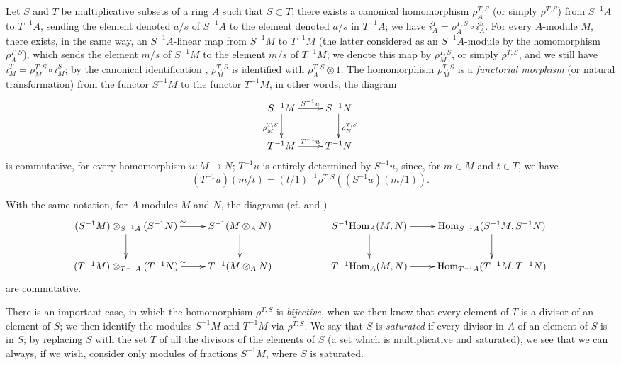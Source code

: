 \begin{env}[1.4.1]
\label{0.1.4.1}
Let $S$ and $T$ be multiplicative subsets of a ring $A$ such that $S\subset T$;
there exists a canonical homomorphism $\rho_A^{T,S}$ (or simply $\rho^{T,S}$)
from $S^{-1}A$ to $T^{-1}A$, sending the element denoted $a/s$ of $S^{-1}A$ to
the element denoted $a/s$ in $T^{-1}A$; we have $i_A^T=\rho_A^{T,S}\circ i_A^S$.
For every $A$-module $M$, there exists, in the same way, an $S^{-1}A$-linear map
from $S^{-1}M$ to $T^{-1}M$ (the latter considered as an $S^{-1}A$-module by
the homomorphism $\rho_A^{T,S}$), which sends the element $m/s$ of $S^{-1}M$
to the element $m/s$ of $T^{-1}M$; we denote this map by $\rho_M^{T,S}$, or
simply $\rho^{T,S}$, and we still have $i_M^T=\rho_M^{T,S}\circ i_M^S$; by the
canonical identification , $\rho_M^{T,S}$ is identified with
$\rho_A^{T,S}\otimes 1$. The homomorphism $\rho_M^{T,S}$ is a \emph{functorial
morphism} (or natural transformation) from the functor $S^{-1}M$ to the functor
$T^{-1}M$, in other words, the diagram
\[
  \xymatrix{
    S^{-1}M\ar[r]^{S^{-1}u}\ar[d]_{\rho_M^{T,S}} &
    S^{-1}N\ar[d]^{\rho_N^{T,S}}\\
    T^{-1}M\ar[r]^{T^{-1}u} &
    T^{-1}N
  }
\]
is
commutative, for every homomorphism $u:M\to N$; $T^{-1}u$ is entirely
determined by $S^{-1}u$, since, for $m\in M$ and $t\in T$, we have
\[
  (T^{-1}u)(m/t)=(t/1)^{-1}\rho^{T,S}((S^{-1}u)(m/1)).
\]
\end{env}

\begin{env}[1.4.2]
\label{0.1.4.2}
With the same notation, for $A$-modules $M$ and $N$, the diagrams (cf.  and )
\[
  \xymatrix{
    (S^{-1}M)\otimes_{S^{-1}A}(S^{-1}N)\ar[r]^\sim \ar[d] &
    S^{-1}(M\otimes_A N)\ar[d] & &
    S^{-1}\Hom_A(M,N)\ar[r]\ar[d] &
    \Hom_{S^{-1}A}(S^{-1}M,S^{-1}N)\ar[d]\\
    (T^{-1}M)\otimes_{T^{-1}A}(T^{-1}N)\ar[r]^\sim &
    T^{-1}(M\otimes_A N) & &
    T^{-1}\Hom_A(M,N)\ar[r] &
    \Hom_{T^{-1}A}(T^{-1}M,T^{-1}N)
  }
\]
are commutative.
\end{env}

\begin{env}[1.4.3]
\label{0.1.4.3}
There is an important case, in which the homomorphism $\rho^{T,S}$ is
\emph{bijective}, when we then know that every element of $T$ is a divisor of an
element of $S$; we then identify the modules $S^{-1}M$ and $T^{-1}M$ via
$\rho^{T,S}$. We say that $S$ is \emph{saturated} if every divisor in $A$ of an
element of $S$ is in $S$; by replacing $S$ with the set $T$ of all the divisors
of the elements of $S$ (a set which is multiplicative and saturated), we see
that we can always, if we wish, consider only modules of
fractions $S^{-1}M$, where $S$ is saturated.
\end{env}

